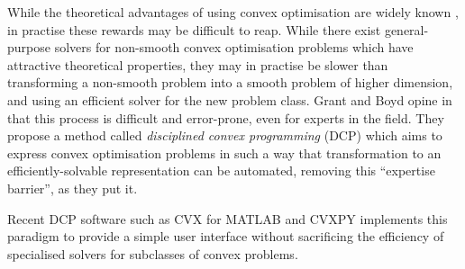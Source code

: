 While the theoretical advantages of using convex optimisation are widely known \cite{Luo06}, in practise these rewards may be difficult to reap.
While there exist general-purpose solvers for non-smooth convex optimisation problems which have attractive theoretical properties, they may in practise be slower than transforming a non-smooth problem into a smooth problem of higher dimension, and using an efficient solver for the new problem class.
Grant and Boyd opine in \cite{Grant08} that this process is difficult and error-prone, even for experts in the field.
They propose a method called {\it disciplined convex programming} (DCP) \cite{Grant06} which aims to express convex optimisation problems in such a way that transformation to an efficiently-solvable representation can be automated, removing this ``expertise barrier'', as they put it.

Recent DCP software such as CVX for MATLAB \cite{CVX} and CVXPY \cite{CVXPY} implements this paradigm to provide a simple user interface without sacrificing the efficiency of specialised solvers for subclasses of convex problems.
